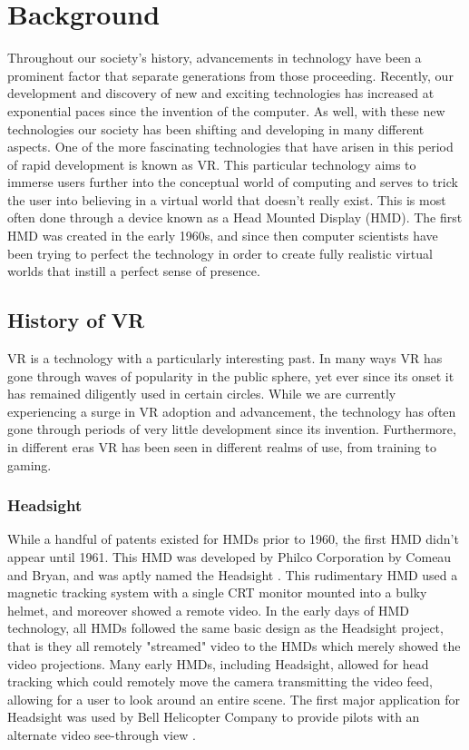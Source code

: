 \chapter{Background}
\label{chap:background}


Throughout our society's history, advancements in technology have been a prominent factor that separate generations from those proceeding. Recently, our development and discovery of new and exciting technologies has increased at exponential paces since the invention of the computer. As well, with these new technologies our society has been shifting and developing in many different aspects. One of the more fascinating technologies that have arisen in this period of rapid development is known as VR. This particular technology aims to immerse users further into the conceptual world of computing and serves to trick the user into believing in a virtual world that doesn't really exist. This is most often done through a device known as a Head Mounted Display (HMD). The first HMD was created in the early 1960s, and since then computer scientists have been trying to perfect the technology in order to create fully realistic virtual worlds that instill a perfect sense of presence.

\section{History of VR}
\label{sec:vrhistory}

VR is a technology with a particularly interesting past. In many ways VR has gone through waves of popularity in the public sphere, yet ever since its onset it has remained diligently used in certain circles. While we are currently experiencing a surge in VR adoption and advancement, the technology has often gone through periods of very little development since its invention. Furthermore, in different eras VR has been seen in different realms of use, from training to gaming.

\subsection{Headsight}
\label{sec:history1}

While a handful of patents existed for HMDs prior to 1960, the first HMD didn't appear until 1961. This HMD was developed by Philco Corporation by Comeau and Bryan, and was aptly named the Headsight \cite{steve_2008}. This rudimentary HMD used a magnetic tracking system with a single CRT monitor mounted into a bulky helmet, and moreover showed a remote video. In the early days of HMD technology, all HMDs followed the same basic design as the Headsight project, that is they all remotely "streamed" video to the HMDs which merely showed the video projections. Many early HMDs, including Headsight, allowed for head tracking which could remotely move the camera transmitting the video feed, allowing for a user to look around an entire scene. The first major application for Headsight was used by Bell Helicopter Company to provide pilots with an alternate video see-through view \cite{michael_emerging_2006}. 

